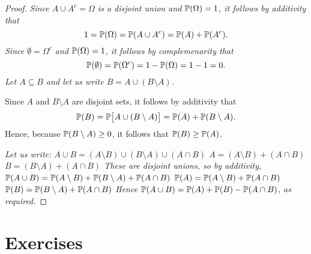 \begin{proof}
\ben
\it %
Since $A\cup A^c=\Omega$ is a disjoint union and $\mathbb{P}(\Omega)=1$, it follows by additivity that 
\[
1 = \mathbb{P}(\Omega) = \mathbb{P}(A\cup A^c) = \mathbb{P}(A) + \mathbb{P}(A^c).
\]
\it %
Since $\emptyset=\Omega^c$ and $\mathbb{P}(\Omega)=1$, it follows by complemenarity that
\[
\mathbb{P}(\emptyset) = \mathbb{P}(\Omega^c) = 1 - \mathbb{P}(\Omega) = 1 - 1 = 0.
\]
\it %
Let $A\subseteq B$ and let us write $B = A\cup (B\setminus A)$. 

Since $A$ and $B\setminus A$ are disjoint sets, it follows by additivity that
\[
\mathbb{P}(B) = \mathbb{P}\big[A\cup (B\setminus A)\big] = \mathbb{P}(A) + \mathbb{P}(B\setminus A).
\]
Hence, because $\mathbb{P}(B\setminus A)\geq 0$, it follows that $\mathbb{P}(B) \geq \mathbb{P}(A)$.

\it %
Let us write:
\bit
\it $A\cup B = (A\setminus B) \cup (B\setminus A) \cup (A\cap B)$
\it $A 		 = (A\setminus B) + (A\cap B)$
\it $B 		 = (B\setminus A) + (A\cap B)$
\eit
These are disjoint unions, so by additivity, 
\bit
\it $\mathbb{P}(A\cup B) = \mathbb{P}(A\setminus B) + \mathbb{P}(B\setminus A) + \mathbb{P}(A\cap B)$
\it $\mathbb{P}(A) 		= \mathbb{P}(A\setminus B) + \mathbb{P}(A\cap B)$
\it $\mathbb{P}(B)		= \mathbb{P}(B\setminus A) + \mathbb{P}(A\cap B)$
\eit
Hence $\mathbb{P}(A\cup B) = \mathbb{P}(A) + \mathbb{P}(B) - \mathbb{P}(A\cap B)$, as required.
\een
\end{proof}


\section{Exercises}

